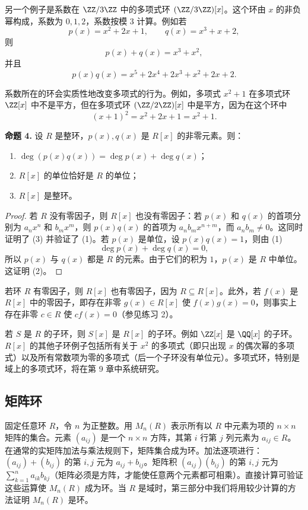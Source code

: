 另一个例子是系数在 $\ZZ/3\ZZ$ 中的多项式环 $(\ZZ/3\ZZ)[x]$。这个环由 $x$ 的非负幂构成，系数为 $0,1,2$，系数按模 $3$ 计算。例如若
\[
  p(x)=x^2+2x+1,
  \qquad q(x)=x^3+x+2,
\]
则
\[
  p(x)+q(x)=x^3+x^2,
\]
并且
\[
  p(x)q(x)=x^5+2x^4+2x^3+x^2+2x+2.
\]

系数所在的环会实质性地改变多项式的行为。例如，多项式 $x^2+1$ 在多项式环 $\ZZ[x]$ 中不是平方，但在多项式环 $(\ZZ/2\ZZ)[x]$ 中是平方，因为在这个环中
\[
  (x+1)^2=x^2+2x+1=x^2+1.
\]

\medskip
\noindent\textbf{命题 4.} 设 $R$ 是整环，$p(x),q(x)$ 是 $R[x]$ 的非零元素。则：
\begin{enumerate}[label=(\arabic*)]
  \item $\deg(p(x)q(x))=\deg p(x)+\deg q(x)$；
  \item $R[x]$ 的单位恰好是 $R$ 的单位；
  \item $R[x]$ 是整环。
\end{enumerate}

\begin{proof}
若 $R$ 没有零因子，则 $R[x]$ 也没有零因子：若 $p(x)$ 和 $q(x)$ 的首项分别为 $a_nx^n$ 和 $b_mx^m$，则 $p(x)q(x)$ 的首项为 $a_nb_mx^{n+m}$，而 $a_nb_m\neq0$。这同时证明了 (3) 并验证了 (1)。若 $p(x)$ 是单位，设 $p(x)q(x)=1$，则由 (1)
\[
  \deg p(x)+\deg q(x)=0,
\]
所以 $p(x)$ 与 $q(x)$ 都是 $R$ 的元素。由于它们的积为 $1$，$p(x)$ 是 $R$ 中单位。这证明 (2)。
\end{proof}

若环 $R$ 有零因子，则 $R[x]$ 也有零因子，因为 $R\subseteq R[x]$。此外，若 $f(x)$ 是 $R[x]$ 中的零因子，即存在非零 $g(x)\in R[x]$ 使 $f(x)g(x)=0$，则事实上存在非零 $c\in R$ 使 $cf(x)=0$（参见练习 2）。

若 $S$ 是 $R$ 的子环，则 $S[x]$ 是 $R[x]$ 的子环。例如 $\ZZ[x]$ 是 $\QQ[x]$ 的子环。$R[x]$ 的其他子环例子包括所有关于 $x^2$ 的多项式（即只出现 $x$ 的偶次幂的多项式）以及所有常数项为零的多项式（后一个子环没有单位元）。多项式环，特别是域上的多项式环，将在第 9 章中系统研究。

\subsection*{矩阵环}
固定任意环 $R$，令 $n$ 为正整数。用 $M_n(R)$ 表示所有以 $R$ 中元素为项的 $n\times n$ 矩阵的集合。元素 $(a_{ij})$ 是一个 $n\times n$ 方阵，其第 $i$ 行第 $j$ 列元素为 $a_{ij}\in R$。在通常的实矩阵加法与乘法规则下，矩阵集合成为环。加法逐项进行：$(a_{ij})+(b_{ij})$ 的第 $i,j$ 元为 $a_{ij}+b_{ij}$。矩阵积 $(a_{ij})(b_{ij})$ 的第 $i,j$ 元为 $\sum_{k=1}^n a_{ik}b_{kj}$（矩阵必须是方阵，才能使任意两个元素都可相乘）。直接计算可验证这些运算使 $M_n(R)$ 成为环。当 $R$ 是域时，第三部分中我们将用较少计算的方法证明 $M_n(R)$ 是环。

